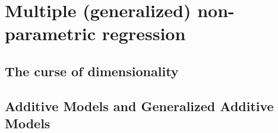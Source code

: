 \chapter{Multiple (generalized) non-parametric regression}

\section{The curse of dimensionality}
\section{Additive Models and Generalized Additive Models}
